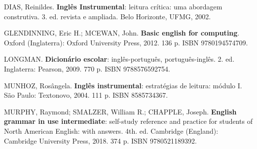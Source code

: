 \begin{pud}
	\begin{bibcomplementar}
		\item DIAS, Reinildes. \textbf{Inglês Instrumental}: leitura crítica: uma abordagem construtiva. 3. ed. revista e ampliada. Belo Horizonte, UFMG, 2002.
		\item GLENDINNING, Eric H.; MCEWAN, John. \textbf{Basic english for computing}. Oxford (Inglaterra): Oxford University Press, 2012. 136 p. ISBN 9780194574709.
		\item LONGMAN. \textbf{Dicionário escolar}: inglês-português, português-inglês. 2. ed. Inglaterra: Pearson, 2009. 770 p. ISBN 9788576592754.
		\item MUNHOZ, Rosângela. \textbf{Inglês instrumental}: estratégias de leitura: módulo I. São Paulo: Textonovo, 2004. 111 p. ISBN 8585734367.
		\item MURPHY, Raymond; SMALZER, William R.; CHAPPLE, Joseph. \textbf{English grammar in use intermediate}: self-study reference and practice for students of North American English: with answers. 4th. ed. Cambridge (England): Cambridge University Press, 2018. 374 p. ISBN 9780521189392.
	
	\end{bibcomplementar}
		
	
\end{pud}



